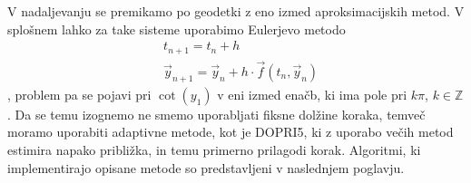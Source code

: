 \documentclass[titlepage]{article}
\begin{document}
V nadaljevanju se premikamo po geodetki z eno izmed aproksimacijskih metod. V splošnem lahko za take sisteme uporabimo Eulerjevo metodo
\begin{equation} \label{e:euler}
    \begin{split}
        &t_{n+1}=t_{n}+h \\
        &\vec{y}_{n+1}=\vec{y}_{n}+h \cdot \vec{f}(t_{n}, \vec{y}_{n})
    \end{split}
\end{equation},
problem pa se pojavi pri $\cot(y_{1})$ v eni izmed enačb, ki ima pole pri
$k\pi$, $k \in \mathbb{Z}$. Da se temu izognemo ne smemo uporabljati fiksne dolžine koraka, temveč moramo uporabiti adaptivne metode, kot je DOPRI5,
ki z uporabo večih metod estimira napako približka, in temu primerno prilagodi korak.
\bigskip
\newline
Algoritmi, ki implementirajo opisane metode so predstavljeni v naslednjem poglavju.
\newpage
\end{document}
